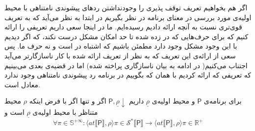 اگر هم بخواهیم تعریف توقف پذیری را وجودنداشتن ردهای پیشوندی نامتناهی با محیط اولیه‌ی مورد بررسی در معنای برنامه در نظر بگیریم در ابتدا به نظر می‌آید که به تعریف قوی‌تری نسبت به آنچه ارائه دادیم رسیده‌ایم. ما در اینجا سعی داریم تعریفی را ارائه کنیم که برای حرف‌هایی که در \cite{calcul} زده شده تا حد امکان مشکل درست نکند، که اگر دیدیم با این وجود مشکل وجود دارد مطمئن باشیم که اشتباه در \cite{calcul} است و نه حرف ما. پس سعی از ارائه‌ی این تعریف که به نظر از تعریف ارائه شده با کار ناسازگارتر می‌آید اجتناب می‌کنیم( در ادامه به بیان ناسازگاری پراخته شده) اما در قضیه‌ی بعدی می‌بینیم که تعریفی که ارائه کردیم با همان که بگوییم در برنامه رد پیشوندی نامتناهی وجود ندارد معادل است.
\begin{thm}
	برای برنامه‌ی $\mathsf{P}$ و محیط اولیه‌ی $\underline{\rho}$ داریم $\mathsf{P} , \underline{\rho} \downarrow $ اگر و تنها اگر با فرض اینکه $\rho$ محیط متناظر با محیط اولیه‌ی $\underline{\rho}$ است و
	$$\forall \pi \in \mathbb{S^{+\infty}} : 
	\langle at \llbracket \mathsf{P} \rrbracket , \rho \rangle \pi \in \mathcal{S^*} \llbracket \mathsf{P} \rrbracket \rightarrow
	\langle at \llbracket \mathsf{P} \rrbracket , \rho \rangle \pi \in \mathbb{R^+}$$
	 
\end{thm}
